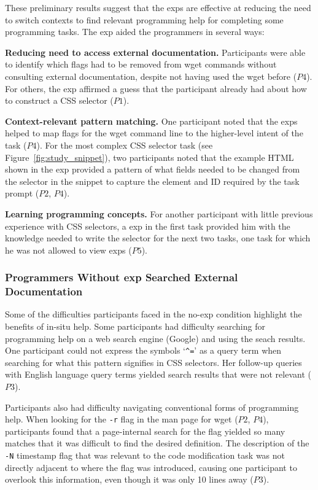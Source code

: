 

These preliminary results suggest that the \glspl{exp} are effective at reducing the need to switch contexts to find relevant programming help  for completing some programming tasks. 
The \gls{exp} aided the programmers in several ways:

{\bf Reducing need to access external documentation.}
Participants were  able to identify which flags had to be removed from wget commands without consulting external documentation, despite not having used the wget before ($P4$).
For others, the \gls{exp} affirmed a guess that the participant already had about how to construct a CSS selector ($P1$).

{\bf Context-relevant pattern matching.}
One participant noted that the \glspl{exp} helped  to map flags for the wget command line to the higher-level intent of the task ($P4$). 
For the most complex CSS selector task (see Figure~\ref{fig:study_snippet}), two participants noted
that the example HTML shown in the \gls{exp} 
provided a pattern of what fields needed to be changed  from the selector in the snippet to capture the element and ID required by the task prompt ($P2$, $P4$).

{\bf Learning programming concepts.}
For another participant with little previous experience with CSS selectors, a \gls{exp} in  the first task provided him with the knowledge needed to write the selector for the next two tasks, one task for which he was not allowed to view \glspl{exp} ($P5$).

\subsubsection{Programmers Without \Gls{exp} Searched External Documentation}

Some of the difficulties participants faced in the no-\gls{exp} condition  highlight the benefits of in-situ help.
Some participants had difficulty searching for programming help on a web search engine (Google) and using the seach results.
One participant could not express the symbols `\texttt{\^{}=}' as a query term when searching for what  this pattern signifies in CSS selectors.
Her follow-up queries with English language query terms  yielded search results that were not relevant ($P3$).

Participants also had difficulty navigating conventional forms of programming help.
When looking for the \texttt{-r} flag in the man page for wget ($P2$, $P4$), participants found that a page-internal  search for the flag yielded so many matches that it was difficult to find the desired definition.
The description of the \texttt{-N} timestamp flag that was relevant to the code modification task was not directly adjacent to where the flag was introduced, causing one participant to overlook this information, even though it was only 10 lines away ($P3$).

